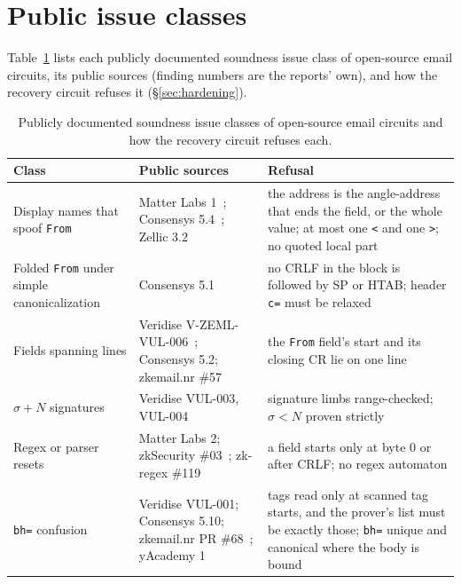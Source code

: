 \section{Public issue classes}\label{app:hardening}

Table~\ref{tab:hardening} lists each publicly documented soundness issue class
of open-source email circuits, its public sources (finding numbers are the
reports' own), and how the recovery circuit refuses it
(\S\ref{sec:hardening}).

\begin{table}[h]
  \caption{Publicly documented soundness issue classes of open-source email
    circuits and how the recovery circuit refuses each.}
  \label{tab:hardening}
  \small
  \begin{tabularx}{\textwidth}{@{}>{\raggedright\arraybackslash}p{}>{\raggedright\arraybackslash}p{}>{\raggedright\arraybackslash}X@{}}
    \toprule
    Class & Public sources & Refusal \\
    \midrule
    Display names that spoof \texttt{From} & Matter Labs 1~\cite{audit-matterlabs-2024}; Consensys 5.4~\cite{audit-consensys-2024}; Zellic 3.2~\cite{audit-zellic-2024} & the address is the angle-address that ends the field, or the whole value; at most one \texttt{<} and one \texttt{>}; no quoted local part \\
    Folded \texttt{From} under simple canonicalization & Consensys 5.1 & no CRLF in the block is followed by SP or HTAB; header \texttt{c=} must be relaxed \\
    Fields spanning lines & Veridise V-ZEML-VUL-006~\cite{audit-veridise-2024}; Consensys 5.2; zkemail.nr \#57~\cite{zkemailnr-issue57} & the \texttt{From} field's start and its closing CR lie on one line \\
    $\sigma + N$ signatures & Veridise VUL-003, VUL-004 & signature limbs range-checked; $\sigma < N$ proven strictly \\
    Regex or parser resets & Matter Labs 2; zkSecurity \#03~\cite{audit-zksecurity-2024}; zk-regex \#119~\cite{zkregex-issue119} & a field starts only at byte 0 or after CRLF; no regex automaton \\
    \texttt{bh=} confusion & Veridise VUL-001; Consensys 5.10; zkemail.nr PR \#68~\cite{zkemailnr-pr68}; yAcademy 1~\cite{audit-yacademy} & tags read only at scanned tag starts, and the prover's list must be exactly those; \texttt{bh=} unique and canonical where the body is bound \\

\end{tabularx}
\end{table}
